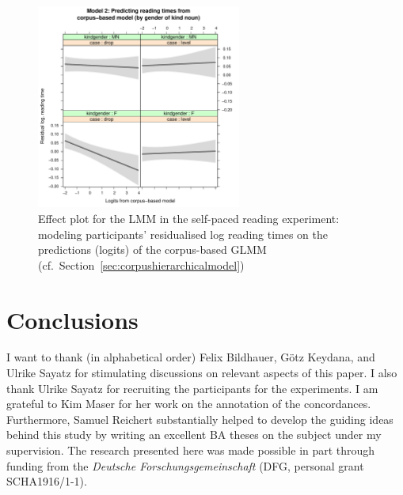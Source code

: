 \documentclass[USenglish]{article}
\begin{document}
\begin{figure}[h]
\centering
\includegraphics[width=0.6\textwidth]{figures/experiment/spr_effects_case+modelPred+gender}
\caption{Effect plot for the LMM in the self-paced reading experiment: modeling participants' residualised log reading times on the predictions (logits) of the corpus-based GLMM (cf.\ Section~\ref{sec:corpushierarchicalmodel})}
\label{fig:spr:continuous:effects}
\end{figure}





\section{Conclusions}








\begin{acknowledgement}
  I want to thank (in alphabetical order) Felix Bildhauer, Götz Keydana, and Ulrike Sayatz for stimulating discussions on relevant aspects of this paper.
  I also thank Ulrike Sayatz for recruiting the participants for the experiments.
  I am grateful to Kim Maser for her work on the annotation of the concordances.
  Furthermore, Samuel Reichert substantially helped to develop the guiding ideas behind this study by writing an excellent BA theses on the subject under my supervision.
  The research presented here was made possible in part through funding from the \textit{Deutsche Forschungsgemeinschaft} (DFG, personal grant SCHA1916/1-1).
\end{acknowledgement}
\end{document}
